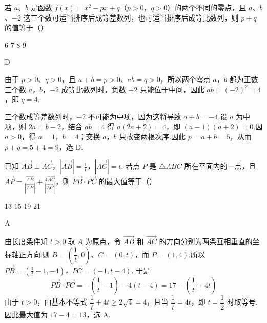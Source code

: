 \begin{problem}
若 \(a\)、\(b\) 是函数 \(f(x) = x^2 - px + q\)（\(p > 0\)，\(q > 0\)）的两个不同的零点，且 \(a\)、\(b\)、\(-2\) 这三个数可适当排序后成等差数列，也可适当排序后成等比数列，则 \(p + q\) 的值等于（\quad）

\choices
    {6}
    {7}
    {8}
    {9}
\end{problem}

\begin{answer}
D
\end{answer}

\begin{solution}
由于 \(p>0\)、\(q>0\)，且 \(a+b=p>0\)、\(ab=q>0\)，所以两个零点 \(a\)，\(b\) 都为正数.三个数 \(a\)，\(b\)，\(-2\) 成等比数列时，负数 \(-2\) 只能位于中间，因此
\(ab=(-2)^2=4\)，即 \(q=4\).

三个数成等差数列时，\(-2\) 不可能为中项，因为这将导致 \(a+b=-4\).设 \(a\) 为中项，则 \(2a=b-2\)，结合 \(ab=4\) 得 \(a(2a+2)=4\)，即 \((a-1)(a+2)=0\).因 \(a>0\)，得 \(a=1\)，\(b=4\)；交换 \(a\)，\(b\) 只改变两根次序.因此 \(p=a+b=5\)，从而 \(p+q=5+4=9\)，选 D.
\end{solution}

\begin{problem}
已知 \(\overrightarrow{AB} \perp \overrightarrow{AC}\)，\(|\overrightarrow{AB}| = \frac{1}{t}\)，\(|\overrightarrow{AC}| = t\). 若点 \(P\) 是 \(\triangle ABC\) 所在平面内的一点，且 \(\overrightarrow{AP} = \frac{\overrightarrow{AB}}{|\overrightarrow{AB}|} + \frac{4\overrightarrow{AC}}{|\overrightarrow{AC}|}\)，则 \(\overrightarrow{PB} \cdot \overrightarrow{PC}\) 的最大值等于（\quad）

\choices
    {13}
    {15}
    {19}
    {21}
\end{problem}

\begin{answer}
A
\end{answer}

\begin{solution}
由长度条件知 \(t>0\).取 \(A\) 为原点，令 \(\overrightarrow{AB}\) 和 \(\overrightarrow{AC}\) 的方向分别为两条互相垂直的坐标轴正方向.则
\(B=(\dfrac1t,0)\)、\(C=(0,t)\)，而
\(P=(1,4)\).所以
\(\overrightarrow{PB}=\left(\frac1t-1,-4\right)\)，\(\overrightarrow{PC}=(-1,t-4)\).
于是
\[
\overrightarrow{PB}\cdot\overrightarrow{PC}
=-\left(\frac1t-1\right)-4(t-4)
=17-\left(\frac1t+4t\right)
\]
由于 \(t>0\)，由基本不等式
\(\dfrac1t+4t\geqslant2\sqrt{4}=4\)，且当 \(\dfrac1t=4t\)，即 \(t=\dfrac12\) 时取等号.因此最大值为 \(17-4=13\)，选 A.
\end{solution}

